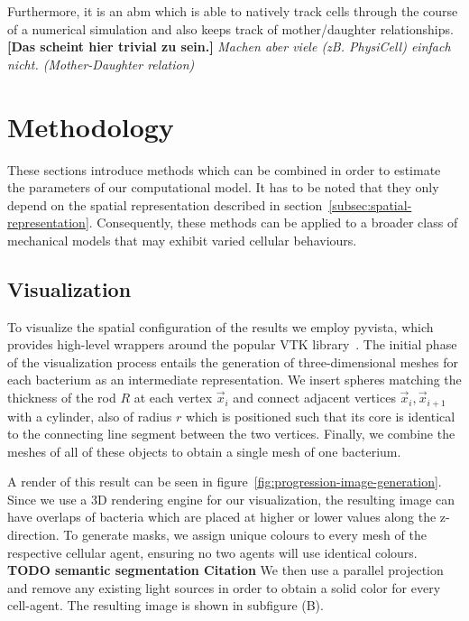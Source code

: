 \documentclass[10pt,letterpaper]{article}
\begin{document}
Furthermore, it is an \ac{abm} which is able to natively track cells through the course of a
numerical simulation and also keeps track of mother/daughter relationships.
\textbf{[Das scheint hier trivial zu sein.]}
\textit{Machen aber viele (zB. PhysiCell) einfach nicht. (Mother-Daughter relation)}

\section{Methodology}
These sections introduce methods which can be combined in order to estimate the parameters of our
computational model.
It has to be noted that they only depend on the spatial representation described in
section~\ref{subsec:spatial-representation}.
Consequently, these methods can be applied to a broader class of mechanical models that may exhibit
varied cellular behaviours.

\subsection{Visualization}
\label{subsection:visualization}
To visualize the spatial configuration of the results we employ pyvista, which provides high-level
wrappers around the popular VTK library~\cite{vtkBook,Sullivan2019}.
The initial phase of the visualization process entails the generation of three-dimensional meshes
for each bacterium as an intermediate representation.
We insert spheres matching the thickness of the rod $R$ at each vertex $\vec{x}_i$ and connect
adjacent vertices $\vec{x}_i,\vec{x}_{i+1}$ with a cylinder, also of radius $r$ which is positioned
such that its core is identical to the connecting line segment between the two vertices.
Finally, we combine the meshes of all of these objects to obtain a single mesh of one bacterium.

A render of this result can be seen in figure~\ref{fig:progression-image-generation}.
Since we use a 3D rendering engine for our visualization, the resulting image can have
overlaps of bacteria which are placed at higher or lower values along the z-direction.
To generate masks, we assign unique colours to every mesh of the respective cellular agent, ensuring
no two agents will use identical colours. \textbf{TODO semantic segmentation Citation}
We then use a parallel projection and remove any existing light sources in order to obtain a solid
color for every cell-agent.
The resulting image is shown in subfigure (B).
\end{document}
